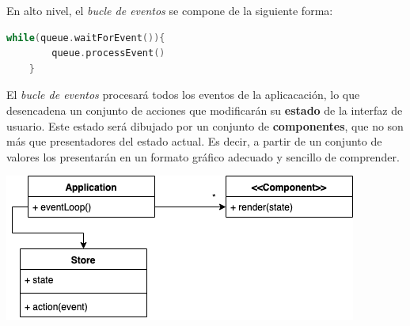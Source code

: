 En alto nivel, el \textit{bucle de eventos} se compone de la siguiente forma:

 \begin{lstlisting}[language=C]
 	while(queue.waitForEvent()){
 		queue.processEvent()
 	}
 \end{lstlisting}
 
 El  \textit{bucle de eventos} procesará todos los eventos de la aplicacación, lo que desencadena un conjunto de acciones que modificarán su \textbf{estado} de la interfaz de usuario. Este estado será dibujado por un conjunto de \textbf{componentes}, que no son más que presentadores del estado actual. Es decir, a partir de un conjunto de valores los presentarán en un formato gráfico adecuado y sencillo de comprender.

\vspace{5mm}
\begin{minipage}[h]{0.8\linewidth}
	\centering
	\includegraphics[width=\linewidth]{assets/ui}
	\label{img:ui}
\end{minipage}

\label{sec:ui}